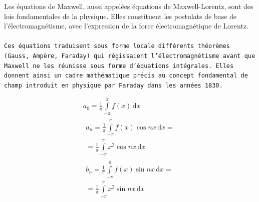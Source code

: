 \documentclass{article}
\begin{document}
Les équations de Maxwell, aussi appelées équations de Maxwell-Lorentz, sont des lois fondamentales de la physique. Elles constituent les postulats de base de l'électromagnétisme, avec l'expression de la force électromagnétique de Lorentz.
\ \\ \ \\
\texttt{Ces équations traduisent sous forme locale différents théorèmes (Gauss, Ampère, Faraday) qui régissaient l'électromagnétisme avant que Maxwell ne les réunisse sous forme d'équations intégrales. Elles donnent ainsi un cadre mathématique précis au concept fondamental de champ introduit en physique par Faraday dans les années 1830.}

\begin{gather*}
a_0=\frac{1}{\pi}\int\limits_{-\pi}^{\pi}f(x)\,\mathrm{d}x\\[6pt]
\begin{split}
a_n=\frac{1}{\pi}\int\limits_{-\pi}^{\pi}f(x)\cos nx\,\mathrm{d}x=\\
=\frac{1}{\pi}\int\limits_{-\pi}^{\pi}x^2\cos nx\,\mathrm{d}x
\end{split}\\[6pt]
\begin{split}
b_n=\frac{1}{\pi}\int\limits_{-\pi}^{\pi}f(x)\sin nx\,\mathrm{d}x=\\
=\frac{1}{\pi}\int\limits_{-\pi}^{\pi}x^2\sin nx\,\mathrm{d}x
\end{split}\\[6pt]
\end{gather*}
\end{document}
